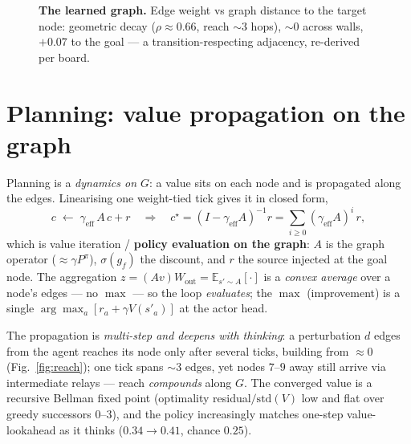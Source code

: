 \documentclass[11pt]{article}
\begin{document}
\begin{figure}[h]\centering
{}
\vspace{-4pt}
\caption{\textbf{The learned graph.} Edge weight vs graph distance to the target node: geometric decay
($\rho{\approx}0.66$, reach $\sim$3 hops), ${\sim}0$ across walls, $+0.07$ to the goal --- a
transition-respecting adjacency, re-derived per board.}
\label{fig:kernel}
\end{figure}

\section{Planning: value propagation on the graph}
\vspace{-2pt}
Planning is a \emph{dynamics on $G$}: a value sits on each node and is propagated along the edges.
Linearising one weight-tied tick gives it in closed form,
\vspace{-2pt}
\[
c \;\leftarrow\; \gamma_{\mathrm{eff}}\,A\,c + r
\quad\Longrightarrow\quad
c^\star=(I-\gamma_{\mathrm{eff}}A)^{-1}r=\sum_{i\ge0}(\gamma_{\mathrm{eff}}A)^{i}\,r,
\]
which is value iteration / \textbf{policy evaluation on the graph}: $A$ is the graph operator
(${\approx}\gamma P^{\pi}$), $\sigma(g_f)$ the discount, and $r$ the source injected at the goal node. The
aggregation $z=(A v)W_{\mathrm{out}}=\mathbb{E}_{s'\sim A}[\cdot]$ is a \emph{convex average} over a node's
edges --- no $\max$ --- so the loop \emph{evaluates}; the $\max$ (improvement) is a single
$\arg\max_a[r_a+\gamma V(s'_a)]$ at the actor head.

The propagation is \emph{multi-step and deepens with thinking}: a perturbation $d$ edges from the agent
reaches its node only after several ticks, building from $\approx0$ (Fig.~\ref{fig:reach}); one tick spans
$\sim$3 edges, yet nodes $7$--$9$ away still arrive via intermediate relays --- reach \emph{compounds} along $G$. The converged value is a recursive Bellman fixed point (optimality
residual$/\mathrm{std}(V)$ low and flat over greedy successors $0$--$3$), and the policy increasingly matches
one-step value-lookahead as it thinks ($0.34{\to}0.41$, chance $0.25$).
\end{document}
